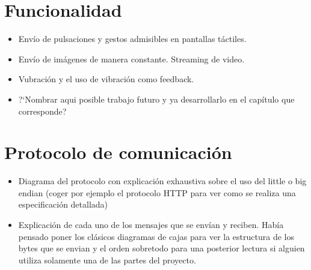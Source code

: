 \section{Funcionalidad}

\begin {itemize}
\item Env\'io de pulsaciones y gestos admisibles en pantallas t\'actiles.
\item Env\'io de im\'agenes de manera constante. Streaming de video.
\item Vubraci\'on y el uso de vibraci\'on como feedback.
\item ?`Nombrar aqui posible trabajo futuro y ya desarrollarlo en el cap\'itulo que corresponde?
\end {itemize}

\section{Protocolo de comunicaci\'on}
\begin {itemize}
\item Diagrama del protocolo con explicaci\'on exhaustiva sobre el uso del little o big endian (coger por ejemplo el protocolo HTTP para ver como se realiza una especificaci\'on detallada)
\item Explicaci\'on de cada uno de los mensajes que se env\'ian y reciben. Hab\'ia pensado poner los cl\'asicos diagramas de cajas para ver la estructura de los bytes que se envian y el orden sobretodo para una posterior lectura si alguien utiliza solamente una de las partes del proyecto.
\end {itemize}

